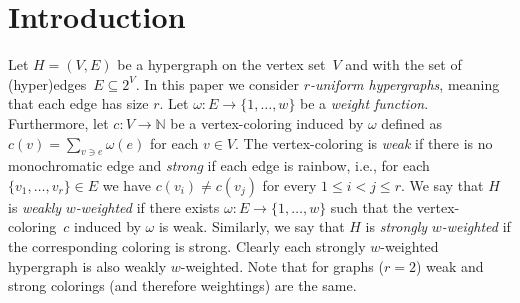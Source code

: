\documentclass[12pt,reqno]{amsart}
\begin{document}
\begin{abstract}
Given an $r$-uniform hypergraph $H=(V,E)$ and a weight function $\omega:E\to\{1,\dots,w\}$, a coloring of vertices of~$H$, induced by~$\omega$, is defined by $c(v) = \sum_{e\ni v} w(e)$ for all $v\in V$. If there exists such a coloring that is strong (that means in each edge no color appears more than once), then we say that $H$ is strongly $w$-weighted. Similarly, if the coloring is weak (that means there is no monochromatic edge), then we say that $H$ is weakly $w$-weighted. In this paper, we show that almost all 3 or 4-uniform hypergraphs are strongly 2-weighted (but not 1-weighted) and almost all $5$-uniform hypergraphs are either 1 or 2 strongly weighted (with a nontrivial distribution). Furthermore, for $r\ge 6$ we show that almost all $r$-uniform hypergraphs are strongly 1-weighted. We complement these results by showing that almost all 3-uniform hypergraphs are weakly 2-weighted but not 1-weighted and for $r\ge 4$ almost all $r$-uniform hypergraphs are weakly 1-weighted.
These results extend a previous work of Addario-Berry, Dalal and Reed for graphs. We also prove general lower bounds and show that there are $r$-uniform hypergraphs which are not strongly $(r^2-r)$-weighted and not weakly 2-weighted. Finally, we show that determining whether a particular uniform hypergraph is strongly 2-weighted is NP-complete.
\end{abstract}

\date{\today}

\maketitle

\section{Introduction}
Let $H=(V,E)$ be a hypergraph on the vertex set~$V$ and with the set of (hyper)edges~$E\subseteq 2^V$. In this paper we consider \emph{$r$-uniform hypergraphs}, meaning that each edge has size $r$. Let $\omega:E\to\{1,\dots,w\}$ be a \emph{weight function}. Furthermore, let $c:V\to \mathbb{N}$ be a vertex-coloring induced by $\omega$ defined as $c(v) = \sum_{v \ni e} \omega(e)$
for each $v\in V$. The vertex-coloring is \emph{weak} if there is no monochromatic edge and \emph{strong} if each edge is rainbow, i.e., for each $\{v_1,\dots,v_r\}\in E$ we have $c(v_i)\neq c(v_j)$ for every $1\le i<j\le r$. We say that $H$ is \emph{weakly} \emph{$w$-weighted} if there exists $\omega:E\to\{1,\dots,w\}$ such that the vertex-coloring~$c$ induced by $\omega$ is weak. Similarly, we say that $H$ is \emph{strongly} \emph{$w$-weighted} if the corresponding coloring is strong.
Clearly each strongly $w$-weighted hypergraph is also weakly $w$-weighted. Note that for graphs ($r=2$) weak and strong colorings (and therefore weightings) are the same.
\end{document}
